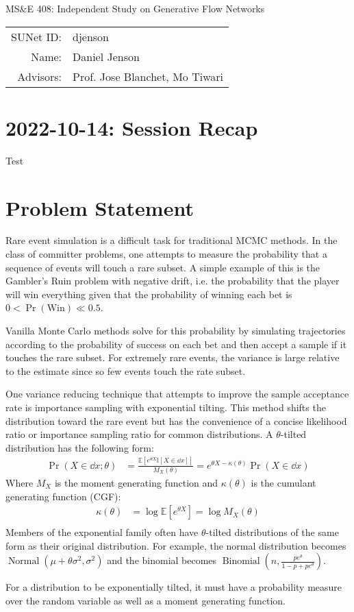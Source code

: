 \documentclass[12pt]{article}
\begin{document}
\begin{center}
  {\Large MS\&E 408: Independent Study on Generative Flow Networks}

	\begin{tabular}{rl}
		SUNet ID:      & djenson                            \\
		Name:          & Daniel Jenson                      \\
		Advisors: & Prof. Jose Blanchet, Mo Tiwari
	\end{tabular}
\end{center}

\section*{2022-10-14: Session Recap}
Test

\section*{Problem Statement}
Rare event simulation is a difficult task for traditional MCMC methods. In the
class of committer problems, one attempts to measure the probability that a
sequence of events will touch a rare subset. A simple example of this is the
Gambler's Ruin problem with negative drift, i.e. the probability that the
player will win everything given that the probability of winning each bet is $0
< \Pr(\text{Win}) \ll 0.5$.
\par
Vanilla Monte Carlo methods solve for this probability by simulating
trajectories according to the probability of success on each bet and then
accept a sample if it touches the rare subset. For extremely rare events, the
variance is large relative to the estimate since so few events touch the rate
subset.
\par
One variance reducing technique that attempts to improve the sample acceptance
rate is importance sampling with exponential tilting. This method shifts the
distribution toward the rare event but has the convenience of a concise
likelihood ratio or importance sampling ratio for common distributions. A
$\theta$-tilted distribution has the following form:
\[
  \begin{aligned}
      \Pr(X\in\dd x;\theta) &= \frac{\mathbb{E}\left[e^{\theta X}\mathbb{I}[X\in\dd x]\right]}{M_X(\theta)}=e^{\theta X-\kappa(\theta)}\Pr(X\in\dd x)
  \end{aligned}
\]
Where $M_X$ is the moment generating function and $\kappa(\theta)$ is the
cumulant generating function (CGF):
\[
  \begin{aligned}
    \kappa(\theta) &= \log \mathbb{E}\left[e^{\theta X}\right]=\log M_X(\theta) \\
  \end{aligned}
\]
Members of the exponential family often have $\theta$-tilted distributions of
the same form as their original distribution. For example, the normal
distribution becomes
$\operatorname{Normal}\left(\mu+\theta\sigma^2,\sigma^2\right)$ and the binomial
becomes $\operatorname{Binomial}\left(n,\frac{pe^\theta}{1-p+pe^\theta}\right)$.
\par
For a distribution to be exponentially tilted, it must have a probability
measure over the random variable as well as a moment generating function.
\end{document}
